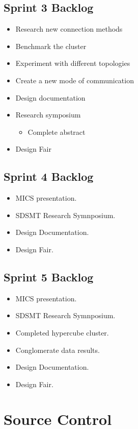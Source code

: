 \subsection*{Sprint 3 Backlog}
\begin{itemize}
	\item Research new connection methods
	\item Benchmark the cluster
	\item Experiment with different topologies
	\item Create a new mode of communication
	\item Design documentation
	\item Research symposium
	\begin{itemize}
		\item Complete abstract
	\end{itemize}
	\item Design Fair
\end{itemize}

\subsection*{Sprint 4 Backlog}
\begin{itemize}
	\item MICS presentation.
	\item SDSMT Research Symnposium. 
	\item Design Documentation.
	\item Design Fair.
\end{itemize}

\subsection*{Sprint 5 Backlog}
\begin{itemize}
	\item MICS presentation.
	\item SDSMT Research Symnposium.
	\item Completed hypercube cluster.
	\item Conglomerate data results.
	\item Design Documentation.
	\item Design Fair.
\end{itemize}

\section{Source  Control}

